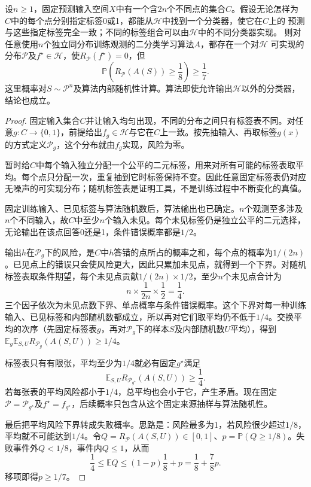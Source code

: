 \begin{theorem}[没有免费的午餐]
\label{thm:no-free-lunch-classification}
设$n\geq1$，固定预测输入空间$X$中有一个含$2n$个不同点的集合$C$。假设无论怎样为
$C$中的每个点分别指定标签0或1，都能从$\mathcal H$中找到一个分类器，使它在$C$上的
预测与这些指定标签完全一致；不同的标签组合可以由$\mathcal H$中的不同分类器实现。
则对任意使用$n$个独立同分布训练观测的二分类学习算法$A$，都存在一个对$\mathcal H$
可实现的分布$\mathcal P$及$f^\star\in\mathcal H$，使$R_{\mathcal P}(f^\star)=0$，但
\begin{equation}
 \mathbb P\left(R_{\mathcal P}(A(S))\geq\frac18\right)\geq\frac17.
 \label{eq:no-free-lunch-probability}
\end{equation}
这里概率对$S\sim\mathcal P^n$及算法内部随机性计算。算法即使允许输出$\mathcal H$以外的分类器，结论也成立。
\end{theorem}

\begin{proof}
固定输入集合$C$并让输入均匀出现，不同的分布之间只有标签表不同。对任意$g:C\to\{0,1\}$，前提给出$f_g\in\mathcal H$与它在$C$上一致。按先抽输入、再取标签$g(x)$的方式定义$\mathcal P_g$，这个分布就由$f_g$实现，风险为零。

暂时给$C$中每个输入独立分配一个公平的二元标签，用来对所有可能的标签表取平均。每个点只分配一次，重复抽到它时标签保持不变。因此任意固定标签表仍对应无噪声的可实现分布；随机标签表是证明工具，不是训练过程中不断变化的真值。

固定训练输入、已见标签与算法随机数后，算法输出也已确定。$n$个观测至多涉及$n$个不同输入，故$C$中至少$n$个输入未见。每个未见标签仍是独立公平的二元选择，无论输出在该点回答0还是1，条件错误概率都是$1/2$。

输出$h$在$\mathcal P_g$下的风险，是$C$中$h$答错的点所占的概率之和，每个点的概率为$1/(2n)$。已见点上的错误只会使风险更大，因此只累加未见点，就得到一个下界。对随机标签表取条件期望，每个未见点贡献$1/(2n)\times1/2$，至少$n$个未见点合计为
\begin{equation}
 n\times\frac1{2n}\times\frac12=\frac14.
 \label{eq:no-free-lunch-expected-risk}
\end{equation}
三个因子依次为未见点数下界、单点概率与条件错误概率。这个下界对每一种训练输入、已见标签和内部随机数都成立，所以再对它们取平均仍不低于$1/4$。交换平均的次序（先固定标签表$g$，再对$\mathcal P_g$下的样本$S$及内部随机数$U$平均），得到$\mathbb E_g\mathbb E_{S,U}R_{\mathcal P_g}(A(S,U))\geq1/4$。

标签表只有有限张，平均至少为$1/4$就必有固定$g^\star$满足
\[
 \mathbb E_{S,U}R_{\mathcal P_{g^\star}}(A(S,U))\geq\frac14.
\]
若每张表的平均风险都小于$1/4$，总平均也会小于它，产生矛盾。现在固定$\mathcal P=\mathcal P_{g^\star}$及$f^\star=f_{g^\star}$，后续概率只包含从这个固定来源抽样与算法随机性。

最后把平均风险下界转成失败概率。思路是：风险最多为1，若风险很少超过$1/8$，平均就不可能达到$1/4$。令$Q=R_{\mathcal P}(A(S,U))\in[0,1]$、$p=\mathbb P(Q\geq1/8)$。失败事件外$Q<1/8$，事件内$Q\leq1$，从而
\[
 \frac14\leq\mathbb E Q\leq(1-p)\frac18+p
 =\frac18+\frac78p.
\]
移项即得$p\geq1/7$。\end{proof}

